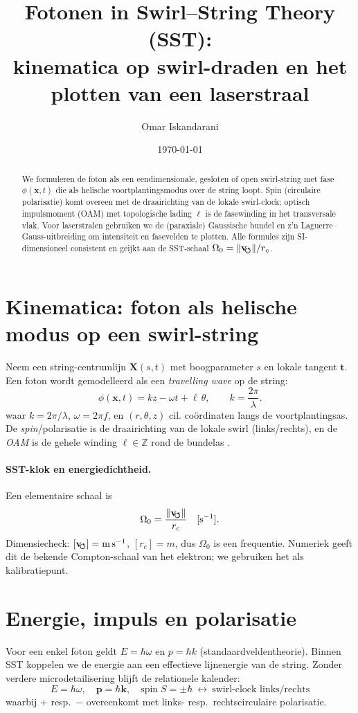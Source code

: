 \documentclass[aps,prb,preprint,amsmath,amssymb]{revtex4-2} %
\title{\textbf{Fotonen in Swirl--String Theory (SST):\\
kinematica op swirl-draden en het plotten van een laserstraal}}
\author{Omar Iskandarani}
\affiliation{Independent Researcher, Groningen, The Netherlands}
\date{\today}
\newcommand{\vswirl}{\mathbf{v}_{\!\mkern-2mu\scriptstyle\boldsymbol{\circlearrowleft}}}
\newcommand{\rc}{r_c}
\begin{document}
    \maketitle

    \begin{abstract}
        We formuleren de foton als een eendimensionale, gesloten of open swirl-string met fase
        $\phi(\mathbf{x},t)$ die als helische voortplantingsmodus over de string loopt. Spin (circulaire polarisatie)
        komt overeen met de draairichting van de lokale swirl-clock; optisch impulsmoment (OAM) met topologische
        lading $\ell$ is de fasewinding in het transversale vlak. Voor laserstralen gebruiken we de
        (para\-xiale) Gaussische bundel en z'n Laguerre–Gauss-uitbreiding om intensiteit en fasevelden te plotten.
        Alle formules zijn SI-dimensioneel consistent en geijkt aan de SST-schaal $\Omega_0=\lVert\vswirl\rVert/\rc$.
    \end{abstract}

    \section{Kinematica: foton als helische modus op een swirl-string}
        Neem een string-centrumlijn $\mathbf{X}(s,t)$ met boogparameter $s$ en lokale tangent $\mathbf{t}$.
        Een foton wordt gemodelleerd als een \emph{travelling wave} op de string:
        \[
            \phi(\mathbf{x},t)=k z - \omega t + \ell\,\theta,\qquad k=\frac{2\pi}{\lambda}.
        \]
        waar $k=2\pi/\lambda$, $\omega=2\pi f$, en $(r,\theta,z)$ cil. coördinaten langs de voortplantingsas.
        De \emph{spin}/polarisatie is de draairichting van de lokale swirl (links/rechts), en de \emph{OAM}
        is de gehele winding $\ell\in\mathbb{Z}$ rond de bundelas \cite{Allen1992,Siegman1986}.

        \paragraph{SST-klok en energiedichtheid.}
            Een elementaire schaal is
            \[
                \Omega_0=\frac{\lVert\vswirl\rVert}{\rc}\quad [\si{ s^{-1} }].
            \]
            Dimensiecheck: $[\vswirl]=\si{m\,s^{-1}}$, $[\rc]=\si{m}$, dus $\Omega_0$ is een frequentie.
            Numeriek geeft dit de bekende Compton-schaal van het elektron; we gebruiken het als kalibratiepunt.

    \section{Energie, impuls en polarisatie}
    Voor een enkel foton geldt $E=\hbar\omega$ en $p=\hbar k$ (standaardveldentheorie).
    Binnen SST koppelen we de energie aan een effectieve lijnenergie van de string.
    Zonder verdere microdetailisering blijft de relationele kalender:
    \[
        \boxed{E=\hbar\omega,\quad \mathbf{p}=\hbar \mathbf{k},\quad
        \text{spin}\;S=\pm\hbar\ \leftrightarrow\ \text{swirl-clock links/rechts}}
    \]
    waarbij $+$ resp.\ $-$ overeenkomt met links- resp.\ rechtscirculaire polarisatie.
\end{document}

